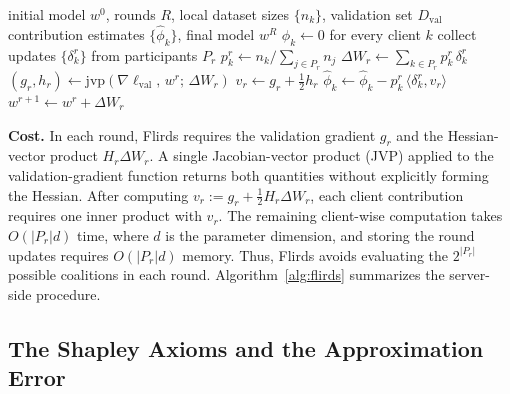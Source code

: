 \documentclass[letterpaper]{article} %
\theoremstyle{definition} %
\newcommand{\lval}{\ell_{\mathrm{val}}}
\begin{document}
\begin{algorithm}[H]
\caption{Flirds (server side)}
\label{alg:flirds}
\begin{algorithmic}[1]
\REQUIRE initial model $w^0$, rounds $R$, local dataset sizes $\{n_k\}$,
validation set $D_{\mathrm{val}}$
\ENSURE contribution estimates $\{\hat\phi_k\}$, final model $w^R$
\STATE $\hat\phi_k \gets 0$ for every client $k$
\STATE collect updates $\{\delta_k^r\}$ from participants $P_r$
\STATE $p_k^r \gets n_k / \sum_{j \in P_r} n_j$
\STATE $\Delta W_r \gets \sum_{k \in P_r} p_k^r\, \delta_k^r$
\STATE $(g_r, h_r) \gets \mathrm{jvp}(\nabla \lval,\, w^r;\, \Delta W_r)$
\STATE $v_r \gets g_r + \tfrac12 h_r$
\STATE $\hat\phi_k \gets \hat\phi_k - p_k^r\, \langle \delta_k^r, v_r \rangle$
\ENDFOR
\STATE $w^{r+1} \gets w^r + \Delta W_r$
\ENDFOR
\end{algorithmic}
\end{algorithm}

\noindent\textbf{Cost.} In each round, Flirds requires the validation gradient \(g_r\) and the Hessian-vector product \(H_r\Delta W_r\). A single Jacobian-vector product (JVP) applied to the validation-gradient function returns both quantities without explicitly forming the Hessian. After computing \(v_r := g_r + \tfrac12 H_r\Delta W_r\), each client contribution requires one inner product with \(v_r\). The remaining client-wise computation takes \(O(|P_r|d)\) time, where \(d\) is the parameter dimension, and storing the round updates requires \(O(|P_r|d)\) memory. Thus, Flirds avoids evaluating the \(2^{|P_r|}\) possible coalitions in each round. Algorithm~\ref{alg:flirds} summarizes the server-side procedure.

\subsection{The Shapley Axioms and the Approximation Error}
\label{sec:theory}
\end{document}
